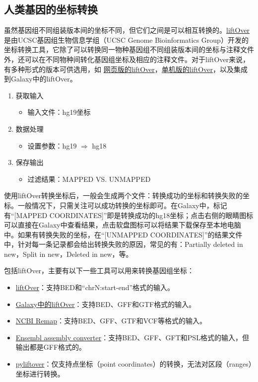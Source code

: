 \documentclass[11pt,a4paper,twoside]{book}
\begin{document}
\subsection{人类基因的坐标转换}
虽然基因组不同组装版本间的坐标不同，但它们之间是可以相互转换的。\href{http://genome.ucsc.edu/cgi-bin/hgLiftOver}{liftOver} 是由UCSC基因组生物信息学组（UCSC Genome Bioinformatics Group）开发的坐标转换工具，它除了可以转换同一物种基因组不同组装版本间的坐标与注释文件外，还可以在不同物种间转化基因组坐标及相应的注释文件。对于liftOver来说，有多种形式的版本可供选用，如 \href{http://genome.ucsc.edu/cgi-bin/hgLiftOver}{网页版的liftOver}，\href{http://hgdownload.cse.ucsc.edu/downloads.html\#source\_downloads}{单机版的liftOver}，以及集成到Galaxy中的liftOver。
\begin{enumerate}
    \item 获取输入
      \begin{itemize}
        \item 输入文件：hg19坐标
      \end{itemize}
    \item 数据处理
      \begin{itemize}
        \item 设置参数：hg19 $\Rightarrow$ hg18
      \end{itemize}
    \item 保存输出
      \begin{itemize}
        \item 过滤结果：MAPPED VS. UNMAPPED
      \end{itemize}
\end{enumerate}

使用liftOver转换坐标后，一般会生成两个文件：转换成功的坐标和转换失败的坐标。一般情况下，只需关注可以成功转换的坐标即可。在Galaxy中，标记有“[MAPPED COORDINATES]”即是转换成功的hg18坐标；点击右侧的眼睛图标可以直接在Galaxy中查看结果，点击软盘图标可以将结果下载保存至本地电脑中。如果有转换失败的坐标，在“[UNMAPPED COORDINATES]”的结果文件中，针对每一条记录都会给出转换失败的原因，常见的有：Partially deleted in new，Split in new，Deleted in new，等。

包括liftOver，主要有以下一些工具可以用来转换基因组坐标：
\begin{itemize}
  \item \href{http://genome.ucsc.edu/cgi-bin/hgLiftOver}{liftOver}：支持BED和“chrN:start-end”格式的输入。
  \item \href{https://usegalaxy.org/}{Galaxy中的liftOver}：支持BED、GFF和GTF格式的输入。
  \item \href{http://www.ncbi.nlm.nih.gov/genome/tools/remap}{NCBI Remap}：支持BED、GFF、GTF和VCF等格式的输入。
  \item \href{http://asia.ensembl.org/Homo\_sapiens/UserData/SelectFeatures}{Ensembl assembly converter}：支持BED、GFF、GFT和PSL格式的输入，但输出都是GFF格式的。
  \item \href{https://pypi.python.org/pypi/pyliftover}{pyliftover}：仅支持点坐标（point coordinates）的转换，无法对区段（ranges）坐标进行转换。
\end{itemize}
\end{document}
